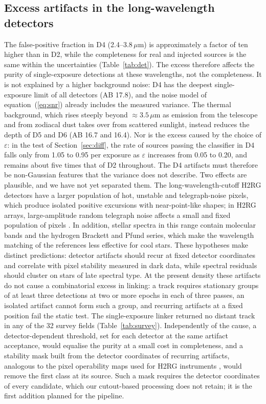 \documentclass[twocolumn,linenumbers]{aastex702}
\begin{document}
\subsection{Excess artifacts in the long-wavelength detectors}\label{sec:d4}
The false-positive fraction in D4 (2.4--3.8\,$\mu$m) is approximately a factor of ten higher than in D2, while the completeness for real and injected sources is the same within the uncertainties (Table~\ref{tab:det}). The excess therefore affects the purity of single-exposure detections at these wavelengths, not the completeness. It is not explained by a higher background noise: D4 has the deepest single-exposure limit of all detectors (AB 17.8), and the noise model of equation~(\ref{eq:snr}) already includes the measured variance. The thermal background, which rises steeply beyond $\approx 3.5\,\mu$m as emission from the telescope and from zodiacal dust \citep{kelsall98} takes over from scattered sunlight, instead reduces the depth of D5 and D6 (AB 16.7 and 16.4). Nor is the excess caused by the choice of $\varepsilon$: in the test of Section~\ref{sec:diff}, the rate of sources passing the classifier in D4 falls only from 1.05 to 0.95 per exposure as $\varepsilon$ increases from 0.05 to 0.20, and remains about five times that of D2 throughout. The D4 artifacts must therefore be non-Gaussian features that the variance does not describe. Two effects are plausible, and we have not yet separated them. The long-wavelength-cutoff H2RG detectors have a larger population of hot, unstable and telegraph-noise pixels, which produce isolated positive excursions with near-point-like shapes; in H2RG arrays, large-amplitude random telegraph noise affects a small and fixed population of pixels \citep{rauscher07,kohley18}. In addition, stellar spectra in this range contain molecular bands and the hydrogen Brackett and Pfund series, which make the wavelength matching of the references less effective for cool stars. These hypotheses make distinct predictions: detector artifacts should recur at fixed detector coordinates and correlate with pixel stability measured in dark data, while spectral residuals should cluster on stars of late spectral type. At the present density these artifacts do not cause a combinatorial excess in linking: a track requires stationary groups of at least three detections at two or more epochs in each of three passes, an isolated artifact cannot form such a group, and recurring artifacts at a fixed position fail the static test. The single-exposure linker returned no distant track in any of the 32 survey fields (Table~\ref{tab:survey}). Independently of the cause, a detector-dependent threshold, set for each detector at the same artifact acceptance, would equalise the purity at a small cost in completeness, and a stability mask built from the detector coordinates of recurring artifacts, analogous to the pixel operability maps used for H2RG instruments \citep{rauscher07}, would remove the first class at its source. Such a mask requires the detector coordinates of every candidate, which our cutout-based processing does not retain; it is the first addition planned for the pipeline.
\end{document}

